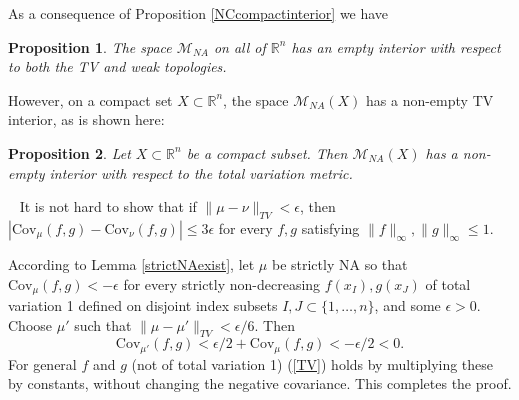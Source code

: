 \documentclass[11pt]{article}
\newcommand{\R}{\mathbb{R}}
\newcommand{\m}{\mathcal{M}}
\newcommand{\C}{\text{Cov}}
\newtheorem{prop}{Proposition}
\newenvironment{Proof}{\noindent{\bf Proof} \ }{\QED}\smallskip
\newcommand\QED{\newline \rightline{$\blacksquare$} \bigskip}
\newenvironment{Remark}{\noindent{\bf Remark} \ }{\QEDa}\smallskip
\newcommand\QEDa{\newline \rightline{$\blacksquare$} \smallskip}
\begin{document}






As a consequence of Proposition \ref{NCcompactinterior} we have

\begin{prop}
The space $\m_{NA}$ on all of $\R^n$ has an empty interior with respect to both the TV and weak topologies.
\end{prop}

However, on a compact set $X\subset \R^n$, the space $\m_{NA}(X)$ has a non-empty TV interior, as is shown here:

\begin{prop}
Let $X\subset \R^n$ be a compact subset. Then
$\m_{NA}(X)$ has a non-empty interior with respect to the 
total variation metric.
\end{prop}

\begin{Proof}
It is not hard to show that if $\lVert \mu - \nu\rVert_{TV} <\epsilon$,
then $|\C_{\mu}(f,g) - \C_{\nu}(f,g) | \leq 3\epsilon$ for every $f,g$ satisfying
$\lVert f\rVert_{\infty},\lVert g\rVert_{\infty} \leq 1$.

According to Lemma \ref{strictNAexist}, let $\mu$ be strictly NA so that $\C_{\mu}(f,g) < -\epsilon$ for every strictly non-decreasing $f(x_I),g(x_J)$ of total variation 1 defined on disjoint index subsets $I,J\subset\{1,\dots, n\}$, and some $\epsilon>0$.
Choose
$\mu'$ such that $\| \mu - \mu' \|_{TV}<\epsilon/6$. Then
\begin{equation}\label{TV}
\C_{\mu'}(f,g) < \epsilon/2 + \C_{\mu}(f,g) < -\epsilon/2 <0.
\end{equation}
For general $f$ and $g$ (not of total variation 1) (\ref{TV}) holds by multiplying these by constants, without changing the negative covariance. This completes the proof. 
\end{Proof}
\end{document}
